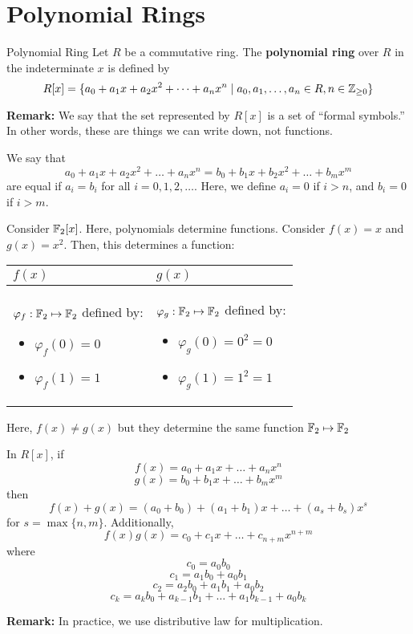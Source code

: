 \documentclass[letterpaper]{article}
\begin{document}
\section{Polynomial Rings}

\begin{definition}{Polynomial Ring}{}
    Let $R$ be a commutative ring. The \textbf{polynomial ring} over $R$ in the indeterminate $x$ is defined by
    \[R[x] = \{a_0 + a_1 x + a_2 x^2 + \dots + a_n x^n \mid a_0, a_1, \dots, a_n \in R, n \in \mathbb{Z}_{\geq 0}\}\]
\end{definition}
\textbf{Remark:} We say that the set represented by $R[x]$ is a set of ``formal symbols.'' In other words, these are things we can write down, not functions. 

\begin{definition}{}{}
    We say that
    \[a_0 + a_1 x + a_2 x^2 + \dots + a_n x^n = b_0 + b_1 x + b_2 x^2 + \dots + b_m x^m\]
    are equal if $a_i = b_i$ for all $i = 0, 1, 2, \dots$. Here, we define $a_i = 0$ if $i > n$, and $b_i = 0$ if $i > m$. 
\end{definition}
Consider $\mathbb{F}_{2}[x]$. Here, polynomials determine functions. Consider $f(x) = x$ and $g(x) = x^2$. Then, this determines a function: 
\begin{center}
    \begin{tabular}{p{3in}|p{3in}}
        $f(x)$ & $g(x)$ \\ 
        \hline 
        $\varphi_{f}: \mathbb{F}_2 \mapsto \mathbb{F}_2$ defined by: 
        \begin{itemize}
            \item $\varphi_{f}(0) = 0$
            \item $\varphi_{f}(1) = 1$
        \end{itemize} & 
        $\varphi_{g}: \mathbb{F}_2 \mapsto \mathbb{F}_{2}$ defined by: 
        \begin{itemize}
            \item $\varphi_{g}(0) = 0^2 = 0$
            \item $\varphi_{g}(1) = 1^2 = 1$
        \end{itemize}
    \end{tabular}
\end{center}
Here, $f(x) \neq g(x)$ but they determine the same function $\mathbb{F}_{2} \mapsto \mathbb{F}_{2}$



\begin{definition}{}{}
    In $R[x]$, if
    \[f(x) = a_0 + a_1 x + \dots + a_n x^n\]
    \[g(x) = b_0 + b_1 x + \dots + b_m x^m\]
    then
    \[f(x) + g(x) = (a_0 + b_0) + (a_1 + b_1)x + \dots + (a_s + b_s) x^s\]
    for $s = \max\{n, m\}$. Additionally,
    \[f(x)g(x) = c_0 + c_1 x + \dots + c_{n + m} x^{n + m}\]
    where 
    \[c_0 = a_0 b_0\]
    \[c_1 = a_1 b_0 + a_0 b_1\]
    \[c_2 = a_2 b_0 + a_1 b_1 + a_0 b_2\]
    \[c_k = a_k b_0 + a_{k - 1}b_1 + \dots + a_1 b_{k - 1} + a_0 b_k\]
\end{definition}
\textbf{Remark:} In practice, we use distributive law for multiplication.
\end{document}
